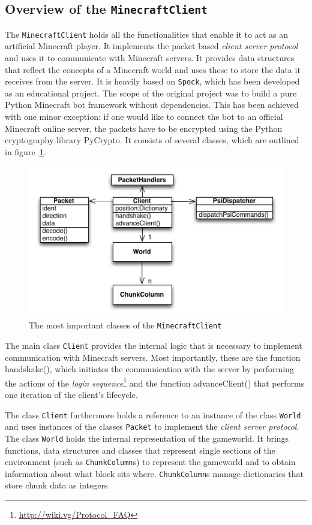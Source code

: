         \subsection{Overview of the \texttt{MinecraftClient}}
The \texttt{MinecraftClient} holds all the functionalities that enable it to act as an artificial Minecraft player. It implements the packet based \emph{client server protocol} and uses it to communicate with Minecraft servers. It provides data structures that reflect the concepts of a Minecraft world and uses these to store the data it receives from the server. It is heavily based on \texttt{Spock}, which has been developed as an educational project. The scope of the original project was to build a pure Python Minecraft bot framework without dependencies. This has been achieved with one minor exception: if one would like to connect the bot to an official Minecraft online server, the packets have to be encrypted using the Python cryptography library PyCrypto. It consists of several classes, which are outlined in figure~\ref{spock_UML}.

\begin{figure}[h]
  \centering
    \includegraphics[width=12cm]{graphics/spockUML_v14}
  \caption{The most important classes of the \texttt{MinecraftClient}}
  \label{spock_UML}
\end{figure}

The main class \texttt{Client} provides the internal logic that is necessary to implement communication with Minecraft servers. Most importantly, these are the function handshake(), which initiates the communication with the server by performing the actions of the \emph{login sequence}\footnote{\url{http://wiki.vg/Protocol_FAQ}} and the function advanceClient() that performs one iteration of the client's lifecycle.


The class \texttt{Client} furthermore holds a reference to an instance of the class \texttt{World} and uses instances of the classes \texttt{Packet} to implement the \emph{client server protocol}. The class \texttt{World} holds the internal representation of the gameworld. It brings functions, data structures and classes that represent single sections of the environment (such as \texttt{ChunkColumn}s) to represent the gameworld and to obtain information about what block sits where. \texttt{ChunkColumn}s manage dictionaries that store chunk data as integers.

